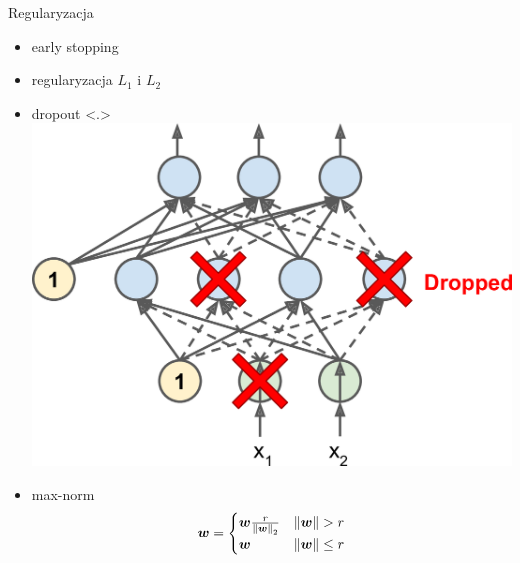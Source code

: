 \documentclass{sa}
\renewcommand{\vec}[1]{\ensuremath\boldsymbol{#1}}
\begin{document}
\begin{frame}{Regularyzacja}
\begin{itemize}
\item<+-> early stopping
\item<+-> regularyzacja $L_1$ i $L_2$
\item<+-> dropout
\only<.>
{
\\\centering
\includegraphics[width=.7\textwidth]{mlst_1109.png}
}
\item<+-> max-norm
\[ \vec{w} = \begin{cases} \vec{w}\frac{r}{\left\|\vec{w}\right\|_2} & \left\|\vec{w}\right\| > r \\ \vec{w} & \left\|\vec{w}\right\| \leq r \end{cases} \]
\end{itemize}
\end{frame}
\end{document}
